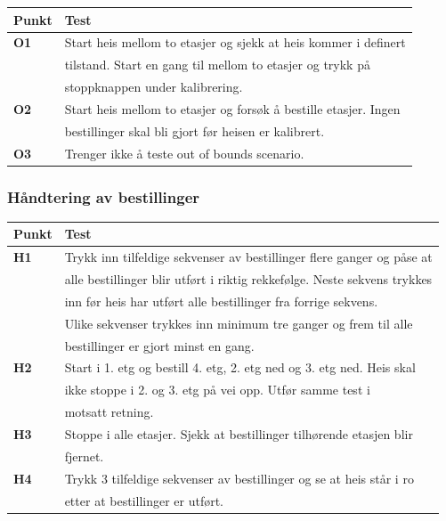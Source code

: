 \documentclass{article}
\begin{document}
\begin{table}[htbp]
\begin{tabularx}{\textwidth}{ l l }  %
\toprule
Punkt & Test \\
        \midrule
        \textbf{O1} & Start heis mellom to etasjer og sjekk at heis kommer i definert \\
        & tilstand. Start en gang til mellom to etasjer og trykk på \\
        & stoppknappen under kalibrering. \\
        \midrule
        \textbf{O2} & Start heis mellom to etasjer og forsøk å bestille etasjer. Ingen \\ 
        & bestillinger skal bli gjort før heisen er kalibrert. \\
        \midrule
        \textbf{O3} & Trenger ikke å teste out of bounds scenario. \\
\bottomrule
\end{tabularx}
\label{table:nonlin}
\end{table}

\subsubsection{Håndtering av bestillinger}
\begin{table}[htbp]
\begin{tabularx}{\textwidth}{ l l }  %
\toprule
Punkt & Test \\
        \midrule
        \textbf{H1} &Trykk inn tilfeldige sekvenser av bestillinger flere ganger og påse at \\
        & alle bestillinger blir utført i riktig rekkefølge. Neste sekvens trykkes \\
        & inn før heis har utført alle bestillinger fra forrige sekvens. \\
        & Ulike sekvenser trykkes inn minimum tre ganger og frem til alle \\
        & bestillinger er gjort minst en gang. \\
        \midrule
        \textbf{H2} & Start i 1. etg og bestill 4. etg, 2. etg ned og 3. etg ned. Heis skal \\
        & ikke stoppe i 2. og 3. etg på vei opp. Utfør samme test i \\
        & motsatt retning. \\
        \midrule
        \textbf{H3} & Stoppe i alle etasjer. Sjekk at bestillinger tilhørende etasjen blir\\
        & fjernet. \\
        \midrule
        \textbf{H4} & Trykk 3 tilfeldige sekvenser av bestillinger og se at heis står i ro \\
        & etter at bestillinger er utført. \\
\bottomrule
\end{tabularx}
\label{table:nonlin}
\end{table}
\newpage
\end{document}

